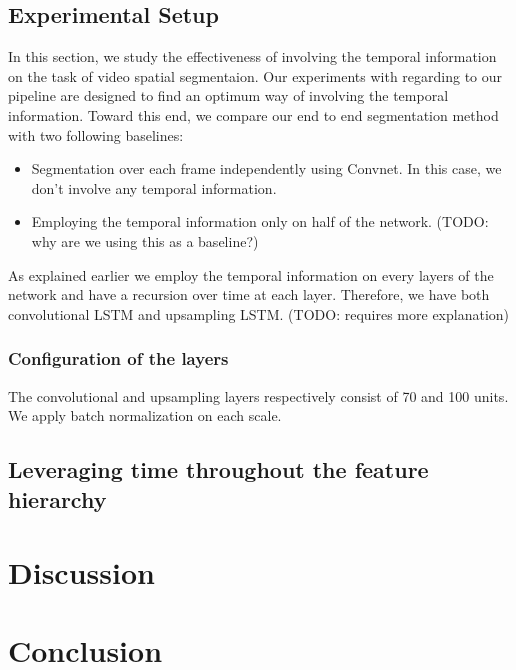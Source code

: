 \subsection{Experimental Setup}
\label{ssec:setup}
In this section, we study the effectiveness of involving the temporal
information on the task of video spatial segmentaion. Our experiments with
regarding to our pipeline are designed to find an optimum way of involving the
temporal information.
Toward this end, we compare our end to end segmentation method with two
following baselines:
\begin{itemize}
    \item Segmentation over each frame independently using Convnet. In this
        case, we don't involve any temporal information.
    \item Employing the temporal information only on half of the network. (TODO:
        why are we using this as a baseline?)
\end{itemize}
As explained earlier we employ the temporal information on every layers of the
network and have a recursion over time at each layer. Therefore, we have both
convolutional LSTM and upsampling LSTM. (TODO: requires more explanation)
\subsubsection{Configuration of the layers}
The convolutional and upsampling layers respectively consist of 70 and 100
units. We apply batch normalization on each scale.

\subsection{Leveraging time throughout the feature hierarchy}
\label{ssec:analysis}

\section{Discussion}
\label{sec:disc}
\section{Conclusion}
